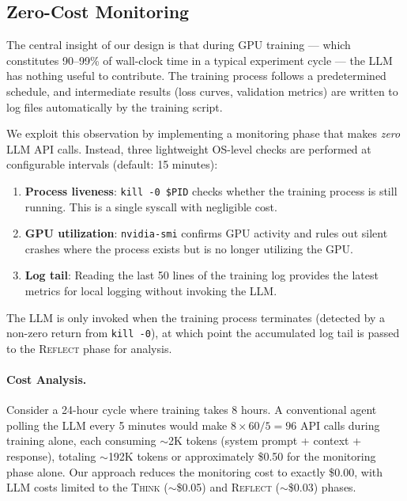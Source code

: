 \subsection{Zero-Cost Monitoring}
\label{sec:zero-cost}

The central insight of our design is that during GPU training --- which constitutes 90--99\% of wall-clock time in a typical experiment cycle --- the LLM has nothing useful to contribute. The training process follows a predetermined schedule, and intermediate results (loss curves, validation metrics) are written to log files automatically by the training script.

We exploit this observation by implementing a monitoring phase that makes \textit{zero} LLM API calls. Instead, three lightweight OS-level checks are performed at configurable intervals (default: 15 minutes):

\begin{enumerate}[nosep]
    \item \textbf{Process liveness}: \texttt{kill -0 \$PID} checks whether the training process is still running. This is a single syscall with negligible cost.
    \item \textbf{GPU utilization}: \texttt{nvidia-smi} confirms GPU activity and rules out silent crashes where the process exists but is no longer utilizing the GPU.
    \item \textbf{Log tail}: Reading the last 50 lines of the training log provides the latest metrics for local logging without invoking the LLM.
\end{enumerate}

The LLM is only invoked when the training process terminates (detected by a non-zero return from \texttt{kill -0}), at which point the accumulated log tail is passed to the \textsc{Reflect} phase for analysis.

\paragraph{Cost Analysis.} Consider a 24-hour cycle where training takes 8 hours. A conventional agent polling the LLM every 5 minutes would make $8 \times 60 / 5 = 96$ API calls during training alone, each consuming $\sim$2K tokens (system prompt + context + response), totaling $\sim$192K tokens or approximately \$0.50 for the monitoring phase alone. Our approach reduces the monitoring cost to exactly \$0.00, with LLM costs limited to the \textsc{Think} ($\sim$\$0.05) and \textsc{Reflect} ($\sim$\$0.03) phases.

